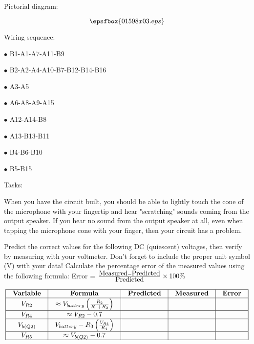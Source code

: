 \noindent Pictorial diagram:

$$\epsfbox{01598x03.eps}$$

\vskip 10pt

\goodbreak

\noindent Wiring sequence:

\medskip
\item{$\bullet$} B1-A1-A7-A11-B9
\item{$\bullet$} B2-A2-A4-A10-B7-B12-B14-B16
\item{$\bullet$} A3-A5
\item{$\bullet$} A6-A8-A9-A15
\item{$\bullet$} A12-A14-B8
\item{$\bullet$} A13-B13-B11
\item{$\bullet$} B4-B6-B10
\item{$\bullet$} B5-B15
\medskip

\vskip 10pt

\goodbreak

\noindent Tasks:

When you have the circuit built, you should be able to lightly touch the cone of the microphone with your fingertip and hear "scratching" sounds coming from the output speaker.  If you hear no sound from the output speaker at all, even when tapping the microphone cone with your finger, then your circuit has a problem.

Predict the correct values for the following DC (quiescent) voltages, then verify by measuring with your voltmeter.  Don't forget to include the proper unit symbol (V) with your data!  Calculate the percentage error of the measured values using the following formula: Error = ${\hbox{Measured} - \hbox{Predicted} \over \hbox{Predicted}} \times 100 \%$


$$\vbox{\offinterlineskip
\halign{\strut
\vrule \quad\hfil # \ \hfil & 
\vrule \quad\hfil # \ \hfil & 
\vrule \quad\hfil # \ \hfil & 
\vrule \quad\hfil # \ \hfil & 
\vrule \quad\hfil # \ \hfil \vrule \cr 
\noalign{\hrule}
%
{\bf Variable} & {\bf Formula} & {\bf Predicted} & {\bf Measured} & {\bf Error} \cr
\noalign{\hrule}
%
$V_{R2}$  &  $\approx V_{battery}\left({R_2 \over {R_1 + R_2}}\right)$  &   &   &  \cr
\noalign{\hrule}
%
$V_{R4}$  &  $\approx V_{R2} - 0.7$  &   &   &  \cr
\noalign{\hrule}
%
$V_{b(Q2)}$  &  $V_{battery} - R_3 \left({V_{R4} \over R_4}\right)$  &   &   &  \cr
\noalign{\hrule}
%
$V_{R5}$  &  $\approx V_{b(Q2)} - 0.7$  &   &   &  \cr
\noalign{\hrule}
} %
}$$ %



